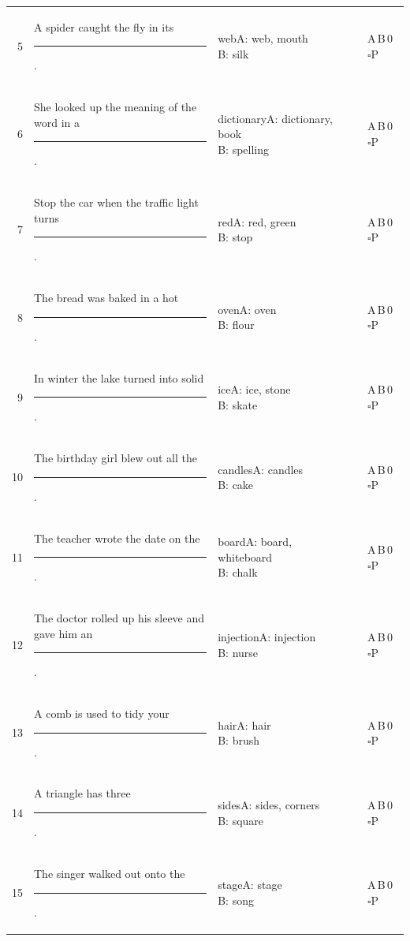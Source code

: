 \documentclass[10pt,a4paper]{article}
\newcommand{\blank}[1][1.2cm]{\rule{#1}{0.4pt}}
\newcommand{\bx}{$\square$}
\begin{document}
{\begin{longtable}{@{}r>{\raggedright\arraybackslash}p{7.2cm}>{\raggedright\arraybackslash}p{1.9cm}p{2.4cm}p{1.1cm}l@{}}
5 & A spider caught the fly in its \rule{1.1cm}{0.4pt}. & web\newline{\scriptsize A: web, mouth\newline B: silk} & \blank[2.2cm] & \blank[0.9cm] & A\,B\,0 \bx P\\
6 & She looked up the meaning of the word in a \rule{1.1cm}{0.4pt}. & dictionary\newline{\scriptsize A: dictionary, book\newline B: spelling} & \blank[2.2cm] & \blank[0.9cm] & A\,B\,0 \bx P\\
7 & Stop the car when the traffic light turns \rule{1.1cm}{0.4pt}. & red\newline{\scriptsize A: red, green\newline B: stop} & \blank[2.2cm] & \blank[0.9cm] & A\,B\,0 \bx P\\
8 & The bread was baked in a hot \rule{1.1cm}{0.4pt}. & oven\newline{\scriptsize A: oven\newline B: flour} & \blank[2.2cm] & \blank[0.9cm] & A\,B\,0 \bx P\\
9 & In winter the lake turned into solid \rule{1.1cm}{0.4pt}. & ice\newline{\scriptsize A: ice, stone\newline B: skate} & \blank[2.2cm] & \blank[0.9cm] & A\,B\,0 \bx P\\
10 & The birthday girl blew out all the \rule{1.1cm}{0.4pt}. & candles\newline{\scriptsize A: candles\newline B: cake} & \blank[2.2cm] & \blank[0.9cm] & A\,B\,0 \bx P\\
11 & The teacher wrote the date on the \rule{1.1cm}{0.4pt}. & board\newline{\scriptsize A: board, whiteboard\newline B: chalk} & \blank[2.2cm] & \blank[0.9cm] & A\,B\,0 \bx P\\
12 & The doctor rolled up his sleeve and gave him an \rule{1.1cm}{0.4pt}. & injection\newline{\scriptsize A: injection\newline B: nurse} & \blank[2.2cm] & \blank[0.9cm] & A\,B\,0 \bx P\\
13 & A comb is used to tidy your \rule{1.1cm}{0.4pt}. & hair\newline{\scriptsize A: hair\newline B: brush} & \blank[2.2cm] & \blank[0.9cm] & A\,B\,0 \bx P\\
14 & A triangle has three \rule{1.1cm}{0.4pt}. & sides\newline{\scriptsize A: sides, corners\newline B: square} & \blank[2.2cm] & \blank[0.9cm] & A\,B\,0 \bx P\\
15 & The singer walked out onto the \rule{1.1cm}{0.4pt}. & stage\newline{\scriptsize A: stage\newline B: song} & \blank[2.2cm] & \blank[0.9cm] & A\,B\,0 \bx P\\
\bottomrule\end{longtable}}
\end{document}
